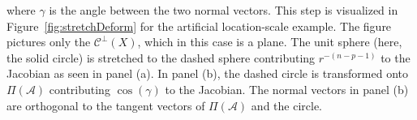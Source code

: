\documentclass[12pt]{article}
\newcommand{\mc}{\mathcal}
\begin{document}
where $\gamma$ is the angle between the two normal vectors.
This step is visualized in Figure~\ref{fig:stretchDeform} for the artificial
location-scale example.  The figure pictures only the $\mathcal{C}^{\perp}(X)$,
which in this case is a plane. The unit sphere (here, the
solid circle) is stretched to the dashed sphere contributing
$r^{-(n-p-1)}$ to the Jacobian as seen in panel (a). In panel (b), the
dashed circle is transformed onto $\Pi(\mc A)$ contributing
$\cos(\gamma)$ to the Jacobian. The normal vectors in panel (b) are
orthogonal to the tangent vectors of $\Pi(\mc A)$ and the circle. %
\end{document}
